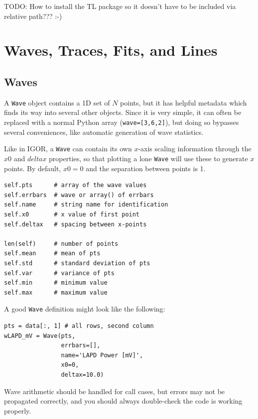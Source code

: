 \documentclass[10pt]{report}
\begin{document}
TODO: How to install the TL package so it doesn't have to be included via relative path??? :-)

\chapter{Waves, Traces, Fits, and Lines}

\section{Waves}
A \texttt{Wave} object contains a 1D set of $N$ points, but it has helpful metadata which finds its way into several other objects. Since it is very simple, it can often be replaced with a normal Python array (\texttt{wave=[3,6,2]}), but doing so bypasses several conveniences, like automatic generation of wave statistics.

Like in IGOR, a \texttt{Wave} can contain its own $x$-axis scaling information through the $x0$ and $deltax$ properties, so that plotting a lone \texttt{Wave} will use these to generate $x$ points. By default, $x0=0$ and the separation between points is 1.

\begin{lstlisting}[caption={Wave() properties}, style=properties]
self.pts      # array of the wave values
self.errbars  # wave or array() of errbars
self.name     # string name for identification
self.x0       # x value of first point
self.deltax   # spacing between x-points

len(self)     # number of points
self.mean     # mean of pts
self.std      # standard deviation of pts
self.var      # variance of pts
self.min      # minimum value
self.max      # maximum value
\end{lstlisting}

A good \texttt{Wave} definition might look like the following:
\begin{lstlisting}[caption=Wave() initiation]
pts = data[:, 1] # all rows, second column
wLAPD_mV = Wave(pts,
                errbars=[],
                name='LAPD Power [mV]',
                x0=0,
                deltax=10.0)
\end{lstlisting}

Wave arithmetic should be handled for call cases, but errors may not be propagated correctly, and you should always double-check the code is working properly.
\end{document}
